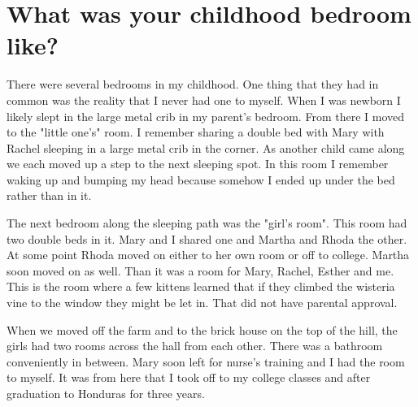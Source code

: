 \section{What was your childhood bedroom like?}
There were several bedrooms in my childhood.
One thing that they had in common was the reality that I never had one to myself.
When I was newborn I likely slept in the large metal crib in my parent's bedroom.
From there I moved to the "little one's" room.
I remember sharing a double bed with Mary with Rachel sleeping in a large metal crib in the corner.
As another child came along we each moved up a step to the next sleeping spot.
In this room I remember waking up and bumping my head because somehow I ended up under the bed rather than in it.

The next bedroom along the sleeping path was the "girl's room".
This room had two double beds in it.
Mary and I shared one and Martha and Rhoda the other.
At some point Rhoda moved on either to her own room or off to college.
Martha soon moved on as well.
Than it was a room for Mary, Rachel, Esther and me.
This is the room where a few kittens learned that if they climbed the wisteria vine to the window they might be let in.
That did not have parental approval.


When we moved off the farm and to the brick house on the top of the hill, the girls had two rooms across the hall from each other.
There was a bathroom conveniently in between.
Mary soon left for nurse's training and I had the room to myself.
It was from here that I took off to my college classes and after graduation to Honduras for three years.

